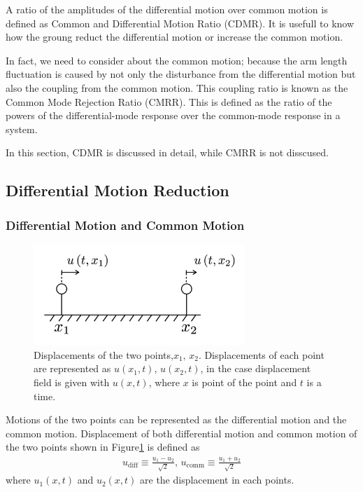 A ratio of the amplitudes of the differential motion over common motion is defined as Common and Differential Motion Ratio (CDMR). It is usefull to know how the groung reduct the differential motion or increase the common motion.

In fact, we need to consider about the common motion; because the arm length fluctuation is caused by not only the disturbance from the differential motion but also the coupling from the common motion. This coupling ratio is known as the Common Mode Rejection Ratio (CMRR). This is defined as the ratio of the powers of the differential-mode response over the common-mode response in a system.

In this section, CDMR is discussed in detail, while CMRR is not disscused.

\subsection{Differential Motion Reduction}
\subsubsection{Differential Motion and Common Motion}
\begin{figure}[H]
  \begin{center}
    \includegraphics[width=8.0cm]{../underground_seismic_noise/img_cdmr_arm.png}
  \end{center}
  \caption{Displacements of the two points,$x_1,\,x_2$. Displacements of each point are represented as $u(x_1,t),\, u(x_2,t)$, in the case displacement field is given with $u(x,t)$, where $x$ is point of the point and $t$ is a time.
  }\label{img:img_diffcomm}  
\end{figure}
Motions of the two points can be represented as the differential motion and the common motion. Displacement of both differential motion and common motion of the two points shown in Figure\ref{img:img_diffcomm} is defined as
\begin{eqnarray}\label{eq:eq22}
  u_{\mathrm{diff}} \equiv \frac{u_{1}-u_{2}}{\sqrt{2}}, \,
  u_{\mathrm{comm}}  \equiv \frac{u_{1}+u_{2}}{\sqrt{2}}
\end{eqnarray}
where $u_{1}(x,t)$ and $u_2(x,t)$ are the displacement in each points.



